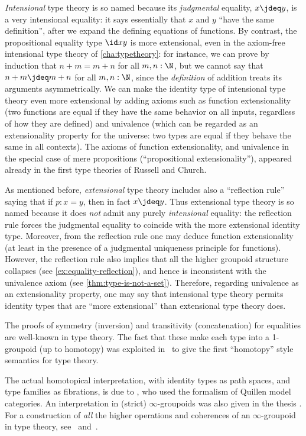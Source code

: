 \emph{Intensional} type theory is so named because its \emph{judgmental} equality, $x\jdeq y$, is a very intensional equality: it says essentially that $x$ and $y$ ``have the same definition'', after we expand the defining equations of functions.
By contrast, the propositional equality type $\id xy$ is more extensional, even in the axiom-free intensional type theory of \cref{cha:typetheory}: for instance, we can prove by induction that $n+m=m+n$ for all $m,n:\N$, but we cannot say that $n+m\jdeq m+n$ for all $m,n:\N$, since the \emph{definition} of addition treats its arguments asymmetrically.
We can make the identity type of intensional type theory even more extensional by adding axioms such as function extensionality (two functions are equal if they have the same behavior on all inputs, regardless of how they are defined) and univalence (which can be regarded as an extensionality property for the universe: two types are equal if they behave the same in all contexts).
The axioms of function extensionality, and univalence in the special case of mere propositions (``propositional extensionality''), appeared already in the first type theories of Russell and Church.

As mentioned before, \emph{extensional} type theory includes also a ``reflection rule'' saying that if $p:x=y$, then in fact $x\jdeq y$.
Thus extensional type theory is so named because it does \emph{not} admit any purely \emph{intensional} equality: the reflection rule forces the judgmental equality to coincide with the more extensional identity type.
Moreover, from the reflection rule one may deduce function extensionality (at least in the presence of a judgmental uniqueness principle for functions).
However, the reflection rule also implies that all the higher groupoid structure collapses (see \cref{ex:equality-reflection}), and hence is inconsistent with the univalence axiom (see \cref{thm:type-is-not-a-set}).
Therefore, regarding univalence as an extensionality property, one may say that intensional type theory permits identity types that are ``more extensional'' than extensional type theory does.

The proofs of symmetry (inversion) and transitivity (concatenation) for equalities are well-known in type theory.
The fact that these make each type into a 1-groupoid (up to homotopy) was exploited in~\cite{hs:gpd-typethy} to give the first ``homotopy'' style semantics for type theory.

The actual homotopical interpretation, with identity types as path spaces, and type families as fibrations, is due to \cite{AW}, who used the formalism of Quillen model categories.  An interpretation in (strict) $\infty$-groupoids was also given in the thesis \cite{mw:thesis}.
For a construction of \emph{all} the higher operations and coherences of an $\infty$-groupoid in type theory, see~\cite{pll:wkom-type} and~\cite{bg:type-wkom}.

